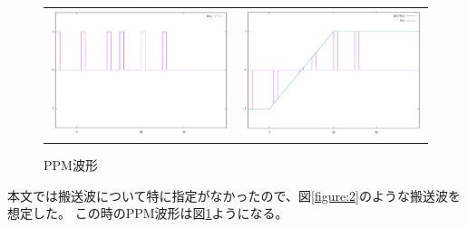\documentclass[dvipdfmx]{jsarticle}
\begin{document}
    \subsection{}
    \begin{figure}[H]
        \begin{tabular}{cc}
            \begin{minipage}{0.45\hsize}
                \centering
                \includegraphics[width=0.9\hsize]{graph2.png}
                \caption{PPM波形の搬送波}
                \label{figure:2}
            \end{minipage} &
            \begin{minipage}{0.45\hsize}
                \centering
                \includegraphics[width=0.9\hsize]{graph3.png}
                \caption{PPM波形}
                \label{figure:3}
            \end{minipage}
        \end{tabular}
    \end{figure}
    本文では搬送波について特に指定がなかったので、図\ref{figure:2}のような搬送波を想定した。
    この時のPPM波形は図\ref{figure:3}ようになる。
\end{document}
